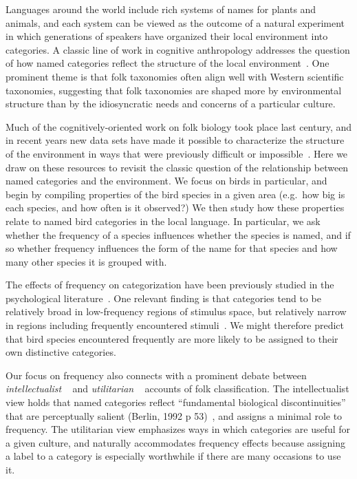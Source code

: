 \documentclass[10pt,letterpaper]{article}
\begin{document}
Languages around the world include rich systems of names for plants and animals, and each system can be viewed as the outcome of a natural experiment in which generations of speakers have organized their local environment into categories. A classic line of work in cognitive anthropology addresses the question of how named categories reflect the structure of the local environment~\cite{berlin2014ethnobiological}. One prominent theme is that folk taxonomies often align well with Western scientific taxonomies, suggesting that folk taxonomies are shaped more by environmental structure than by the idiosyncratic needs and concerns of a particular culture. 

Much of the cognitively-oriented work on folk biology took place last century, and in recent years new data sets have made it possible to characterize the structure of the environment in ways that were previously difficult or impossible~\cite{sullivan2009ebird,wilman2014eltontraits}. Here we draw on these resources to revisit the classic question of the relationship between named categories and the environment. We focus on birds in particular, and begin by compiling properties of the bird species in a given area (e.g.\ how big is each species, and how often is it observed?) We then study how these properties relate to named bird categories in the local language. In particular, we ask whether the frequency of a species influences whether the species is named, and if so whether frequency influences the form of the name for that species and how many other species it is grouped with. 

The effects of frequency on categorization have been previously studied in the psychological literature~\cite{parducci83,nosofsky88,barsalouhl98}.  One relevant finding is that categories tend to be relatively broad in low-frequency regions of stimulus space, but relatively narrow in regions including frequently encountered stimuli~\cite{parducci83}. We might therefore predict that bird species encountered frequently are more likely to be assigned to their own distinctive categories.  

Our focus on frequency also connects with a prominent debate between \emph{intellectualist} ~\cite{berlin2014ethnobiological} and \emph{utilitarian} ~\cite{hunn1982utilitarian} accounts of folk classification. The intellectualist view holds that named categories reflect ``fundamental biological discontinuities'' that are perceptually salient (Berlin, 1992 p 53)~\nocite{berlin2014ethnobiological}, and assigns a minimal role to frequency. The utilitarian view emphasizes ways in which categories are useful for a given culture, and naturally accommodates frequency effects because assigning a label to a category is especially worthwhile if there are many occasions to use it.
\end{document}
